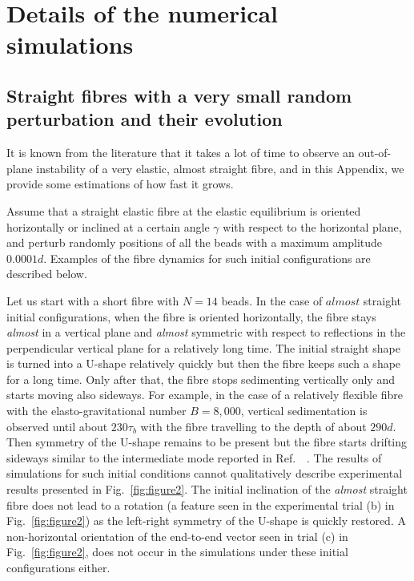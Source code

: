 \documentclass{article}
\begin{document}
\section{Details of the numerical simulations} %
\label{aA}

\subsection{Straight fibres with a very small random perturbation and their evolution}\label{straight}

It is known from the literature \cite{lagomarsino2005hydrodynamic,saggiorato2015conformations} that it takes a lot of time to observe an out-of-plane instability of a very elastic, almost straight fibre, and in this Appendix, we provide some estimations of how fast it grows.

Assume that a straight elastic fibre at the elastic equilibrium is oriented horizontally or inclined at a certain angle $\gamma$ with respect to the horizontal plane, and perturb randomly  positions of all the beads %
with a maximum amplitude %
$0.0001 d$. Examples of the fibre dynamics for such initial configurations are described below.

Let us start with a short fibre with $N=14$ beads. 
In the case of  $almost$ straight initial configurations, when the fibre is oriented horizontally, the fibre stays \textit{almost} in a vertical plane and \textit{almost} symmetric with respect to reflections in the perpendicular vertical plane %
for a relatively long time. 
The initial straight shape is turned into a U-shape relatively quickly but then the fibre keeps such a shape for a long time. %
Only after that, the fibre stops sedimenting vertically only and starts moving also sideways.
For example, in the case of a relatively flexible fibre with the elasto-gravitational number $B=8,000$, vertical sedimentation is observed until about $230 \tau_{b}$ with the fibre travelling to the depth of about $290d$. 
Then symmetry of the U-shape remains to be present but the fibre starts drifting sideways similar to the intermediate mode reported in Ref.~~\cite{saggiorato2015conformations}. 
The results of simulations for such %
initial conditions cannot qualitatively describe experimental results presented in Fig.~\ref{fig:figure2}. 
The initial inclination of the \textit{almost} straight fibre does not lead to a rotation (a feature seen in the experimental trial (b) in Fig.~\ref{fig:figure2}) as the left-right symmetry of the U-shape is quickly restored. %
A non-horizontal
orientation of the end-to-end vector seen in trial (c) in Fig.~\ref{fig:figure2}, does not occur in the simulations under these initial configurations either.
\end{document}
